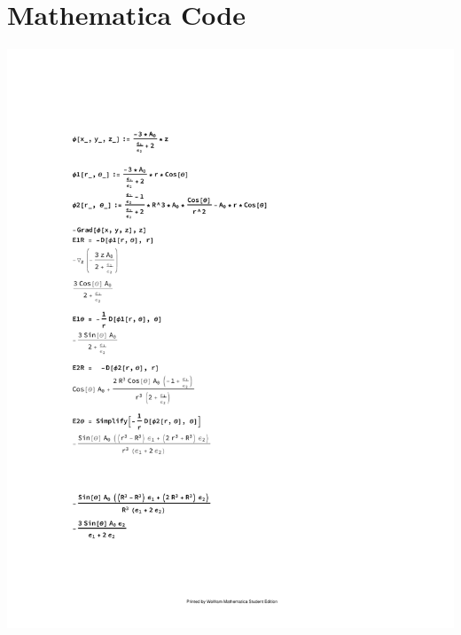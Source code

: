 \documentclass[a4paper, 11pt]{article}
\begin{document}
	
\section*{Mathematica Code}
\includegraphics[scale=1.0]{code}
\end{document}
